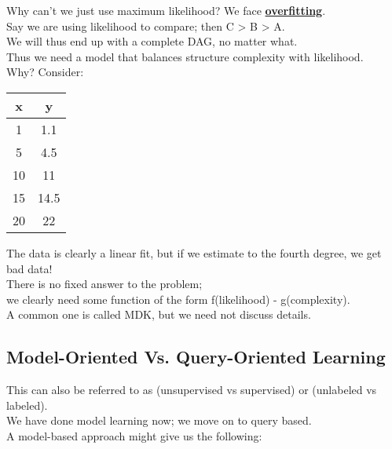 \documentclass[../../lecture_notes.tex]{subfiles}
\begin{document}
\noindent Why can’t we just use maximum likelihood? We face \textbf{\underline{overfitting}}.\\
Say we are using likelihood to compare; then C > B > A.\\
	\indent We will thus end up with a complete DAG, no matter what.\\
	\indent Thus we need a model that balances structure complexity with likelihood.\\
	\indent Why? Consider:

\begin{center}
\begin{minipage}{0.2\textwidth}
	\begin{tabular} { | c | c | } \hline x & y\\\hline 1 & 1.1\\5 & 4.5\\10 & 11\\15 & 14.5\\20 & 22\\\hline\end{tabular}
\end{minipage}%
\begin{minipage}{0.8\textwidth}
\end{minipage}
\end{center}

\noindent The data is clearly a linear fit, but if we estimate to the fourth degree, we get bad data!\\
There is no fixed answer to the problem; \\
\indent we clearly need some function of the form f(likelihood) - g(complexity).\\
A common one is called MDK, but we need not discuss details.\\

\subsection*{Model-Oriented Vs. Query-Oriented Learning}
\noindent This can also be referred to as (unsupervised vs supervised) or (unlabeled vs labeled).\\
We have done model learning now; we move on to query based.\\
	\indent A model-based approach might give us the following:
\end{document}
